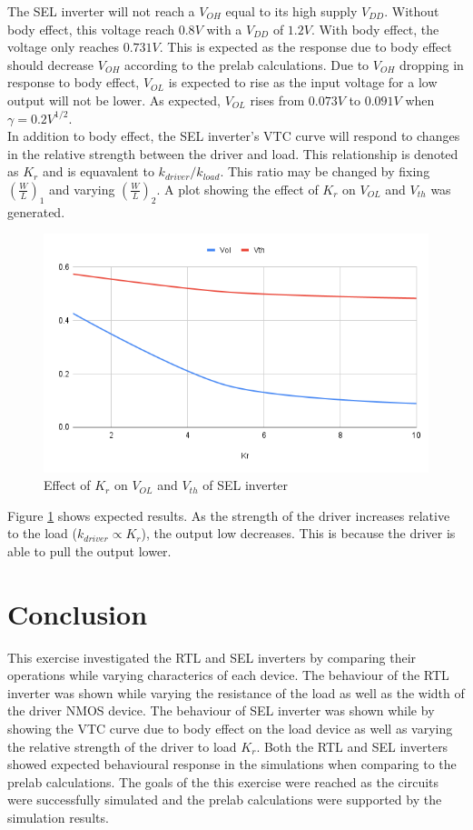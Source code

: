 \documentclass[CMPE]{../KGCOEReport}
\begin{document}
	The SEL inverter will not reach a $V_{OH}$ equal to its high supply $V_{DD}$.
	Without body effect, this voltage reach $0.8V$ with a $V_{DD}$ of $1.2V$.
	With body effect, the voltage only reaches $0.731V$. This is expected as the
	response due to body effect should decrease $V_{OH}$ according to the prelab
	calculations. Due to $V_{OH}$ dropping in response to body effect, $V_{OL}$
	is expected to rise as the input voltage for a low output will not be lower.
	As expected, $V_{OL}$ rises from $0.073V$ to $0.091V$ 
	when $\gamma=0.2V^{1/2}$.\\

	In addition to body effect, the SEL inverter's VTC curve will respond to
	changes in the relative strength between the driver and load.
	This relationship is denoted as $K_r$ and is equavalent to
	$k_{driver} / k_{load}$. This ratio may be changed by fixing $(\frac{W}{L})_1$
	and varying $(\frac{W}{L})_2$. A plot showing the effect of $K_r$ on $V_{OL}$
	and $V_{th}$ was generated.
	
	\begin{figure}[h!]
		\centering
       \includegraphics[width=5.5in]{img/vol_vth_kr.png}
       \caption{Effect of $K_r$ on $V_{OL}$ and $V_{th}$ of SEL inverter}
       \label{fig:kr}
	 \end{figure}

	Figure \ref{fig:kr} shows expected results. As the strength of the driver
	increases relative to the load ($k_{driver} \propto K_r$), the output low
	decreases. This is because the driver is able to pull the output lower.

	\section*{Conclusion}
	This exercise investigated the RTL and SEL inverters by comparing their
	operations while varying characterics of each device. The behaviour of the
	RTL inverter was shown while varying the resistance of the load as well as
	the width of the driver NMOS device. The behaviour of SEL inverter was
	shown while by showing the VTC curve due to body effect on the load
	device as well as varying the relative strength of the driver to load $K_r$.
	Both the RTL and SEL inverters showed expected behavioural response in the
	simulations when comparing to the prelab calculations. The goals of the this
	exercise were reached as the circuits were successfully simulated and the
	prelab calculations were supported by the simulation results.
\end{document}

